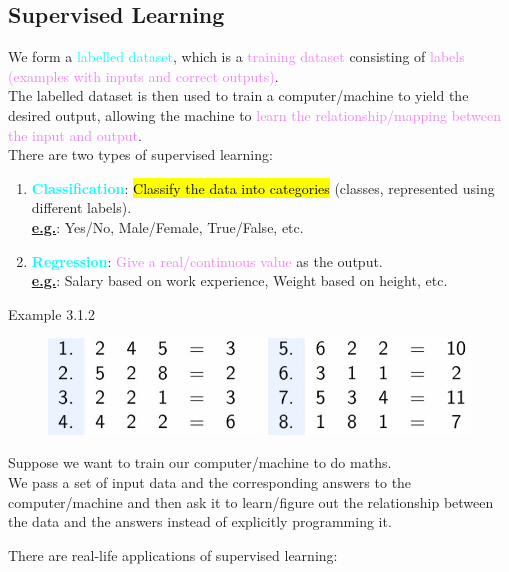 \documentclass{book}
\begin{document}
\subsection{Supervised Learning}
We form a \textcolor{cyan}{labelled dataset}, which is a \textcolor{violet}{training dataset} consisting of \textcolor{violet}{labels (examples with inputs and correct outputs)}.\\
The labelled dataset is then used to train a computer/machine to yield the desired output, allowing the machine to \textcolor{violet}{learn the relationship/mapping between the input and output}.\\
There are two types of supervised learning:
\begin{enumerate}
    \item \textcolor{cyan}{\textbf{Classification}}: \hl{Classify the data into categories} (classes, represented using different labels). \\
    \underline{\textbf{e.g.}}: Yes/No, Male/Female, True/False, etc.
    \item \textcolor{cyan}{\textbf{Regression}}: \textcolor{violet}{Give a real/continuous value} as the output.\\
    \underline{\textbf{e.g.}}: Salary based on work experience, Weight based on height, etc.
\end{enumerate}
\begin{egBox}{Example 3.1.2}{}
    \begin{figure}
        \centering
        \includegraphics[scale=0.24]{chapter 3/ch3_figure1.jpeg}
    \end{figure}
    \raggedright
    Suppose we want to train our computer/machine to do maths.\\
    We pass a set of input data and the corresponding answers to the computer/machine and then ask it to learn/figure out the relationship between the data and the answers instead of explicitly programming it.\\
\end{egBox}
There are real-life applications of supervised learning:
\end{document}
